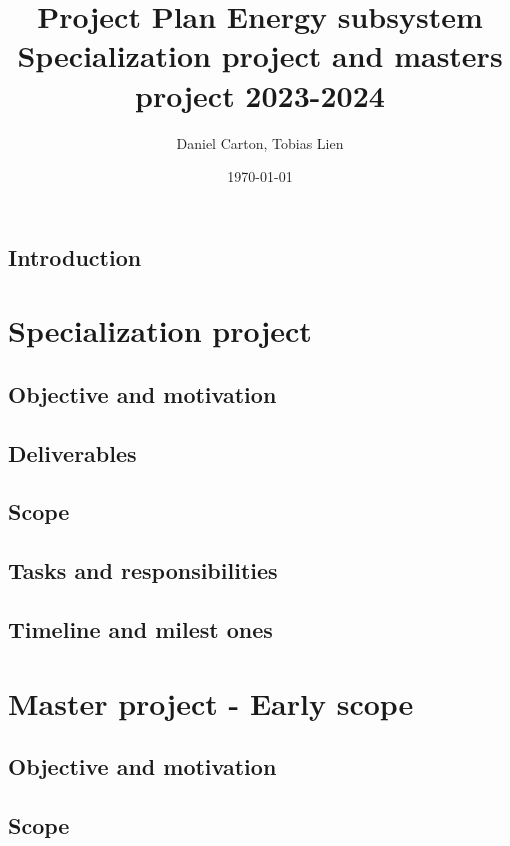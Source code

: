 \documentclass[a4paper, 12pt]{report}
\title{Project Plan Energy subsystem \\ \small{Specialization project and masters project 2023-2024}}
\author{Daniel Carton, Tobias Lien}
\date{\today}
\begin{document}
\maketitle

\tableofcontents
\newpage

\section{Introduction}

\chapter{Specialization project}

\section{Objective and motivation} %
\section{Deliverables}          %
\section{Scope}                %
\section{Tasks and responsibilities} %
\section{Timeline and milest ones}   %


\chapter{Master project - Early scope}

\section{Objective and motivation} %
\section{Scope}                %
\end{document}
